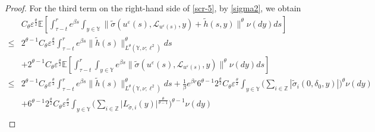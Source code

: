 \documentclass[11pt]{article}
\numberwithin{equation}{section}
\theoremstyle{plain}
\begin{document}
\begin{proof}
 For the third term on the right-hand side of \eqref{scr-5},  
 by \eqref{sigma2}, we obtain     
 \begin{align} \label{scr-7}        
       & C_{\theta} \varepsilon^{\frac{\theta}{2} }
                  \mathbb{E}
 	                     \left[ \int_{\tau-t}^{r} e^{\beta s}
                                       \int_{y \in \mathbb{Y} }
 	                                        \| \widetilde{\sigma}(u^{\varepsilon}(s), \mathcal{L}_{u^{\varepsilon}(s)}, y)
 	                                            + \widetilde{h}(s,y)
 	                                        \|^{\theta}
 	                                   \nu(dy) ds
 	                     \right]  \nonumber\\
 \le & 2^{\theta-1} C_{\theta} \varepsilon^{\frac{\theta}{2} }
	            \int_{\tau-t}^{r} e^{\beta s} 
	                     \| \widetilde{h}(s) \|^{\theta}_{L^{\theta}(\mathbb{Y}, \nu; \ell^2)} ds \nonumber\\
	  & + 2^{\theta-1} C_{\theta} \varepsilon^{\frac{\theta}{2} }
       	            \mathbb{E}
       	                  \left[ \int_{\tau-t}^{r} 
	                                   \int_{y \in \mathbb{Y} }
       	                                  e^{\beta s}
	                                      \| \widetilde{\sigma}(u^{\varepsilon}(s), \mathcal{L}_{u^{\varepsilon}(s)}, y) \|^{\theta}
	                                   \nu(dy) ds
	                      \right]  \nonumber\\
 \le & 2^{\theta-1} C_{\theta} \varepsilon^{\frac{\theta}{2} }
              \int_{\tau-t}^{r} e^{\beta s} 
 	              \| \widetilde{h}(s) \|^{\theta}_{L^{\theta}(\mathbb{Y}, \nu; \ell^2)} ds  
 	     + \frac{1}{\beta} e^{\beta r}
 	               	   6^{\theta-1} 2^{\frac{\theta}{2}} C_{\theta} \varepsilon^{\frac{\theta}{2} }
 	     	                 \int_{y \in \mathbb{Y} }
 	     	                      \Big( \sum_{i \in \mathbb{Z} }
 	                                      	     |\widetilde{\sigma}_{i}(0,\delta_0,y)|
 	     	                      \Big)^{\theta}
 	     	                 \nu(dy)  \nonumber\\
	  & + 6^{\theta-1} 2^{\frac{\theta}{2}} C_{\theta} \varepsilon^{\frac{\theta}{2} }
  	            \int_{y \in \mathbb{Y} }
	                         \Big( \sum_{i \in \mathbb{Z} }
	                                      \big| L_{\tilde{\sigma},i}(y) \big|^{\frac{\theta}{\theta-1} }
	                         \Big)^{\theta-1}
	                     \nu(dy)  \nonumber\\

\end{align}
\end{proof}
\end{document}
